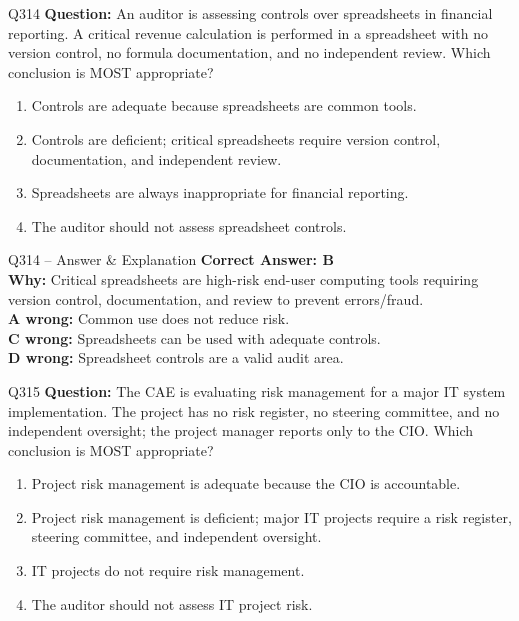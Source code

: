 \documentclass[aspectratio=169,10pt]{beamer}
\begin{document}
	\begin{frame}[t]{Q314}
		\small
		\textbf{Question:} An auditor is assessing controls over spreadsheets in financial reporting. A critical revenue calculation is performed in a spreadsheet with no version control, no formula documentation, and no independent review. Which conclusion is MOST appropriate?
		\begin{enumerate}[label=\Alph*.,itemsep=1pt,topsep=2pt]
			\item Controls are adequate because spreadsheets are common tools.
			\item Controls are deficient; critical spreadsheets require version control, documentation, and independent review.
			\item Spreadsheets are always inappropriate for financial reporting.
			\item The auditor should not assess spreadsheet controls.
		\end{enumerate}
	\end{frame}
	
	\begin{frame}[t]{Q314 -- Answer \& Explanation}
		\small
		\textbf{Correct Answer: B} \\[4pt]
		\textbf{Why:} Critical spreadsheets are high-risk end-user computing tools requiring version control, documentation, and review to prevent errors/fraud. \\[4pt]
		\textbf{A wrong:} Common use does not reduce risk. \\[2pt]
		\textbf{C wrong:} Spreadsheets can be used with adequate controls. \\[2pt]
		\textbf{D wrong:} Spreadsheet controls are a valid audit area.
	\end{frame}
	
	\begin{frame}[t]{Q315}
		\small
		\textbf{Question:} The CAE is evaluating risk management for a major IT system implementation. The project has no risk register, no steering committee, and no independent oversight; the project manager reports only to the CIO. Which conclusion is MOST appropriate?
		\begin{enumerate}[label=\Alph*.,itemsep=1pt,topsep=2pt]
			\item Project risk management is adequate because the CIO is accountable.
			\item Project risk management is deficient; major IT projects require a risk register, steering committee, and independent oversight.
			\item IT projects do not require risk management.
			\item The auditor should not assess IT project risk.
		\end{enumerate}
	\end{frame}
	
\end{document}
